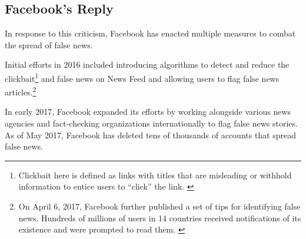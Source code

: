 \subsection{Facebook's Reply}

\par In response to this criticism, Facebook has enacted multiple measures to combat the spread of false news. \cite{fb_newsroom,fb_hoaxes_2016,guardian_tips,tc_downranks,tc_ai,telegraph_delete}

\par Initial efforts in 2016 included introducing algorithms to detect and reduce the clickbait\footnote{Clickbait here is defined as links with titles that are misleading or withhold information to entice users to ``click'' the link. \cite{fb_hoaxes_2016}} and false news on News Feed \cite{fb_hoaxes_2016} and allowing users to flag false news articles.\footnote{On April 6, 2017, Facebook further published a set of tips for identifying false news. Hundreds of millions of users in 14 countries received notifications of its existence and were prompted to read them. \cite{guardian_tips}} \cite{tc_downranks} 

\par In early 2017, Facebook expanded its efforts by working alongside various news agencies and fact-checking organizations internationally to flag false news stories. \cite{guardian_steps} As of May 2017, Facebook has deleted tens of thousands of accounts that spread false news. \cite{telegraph_delete}

\vfill